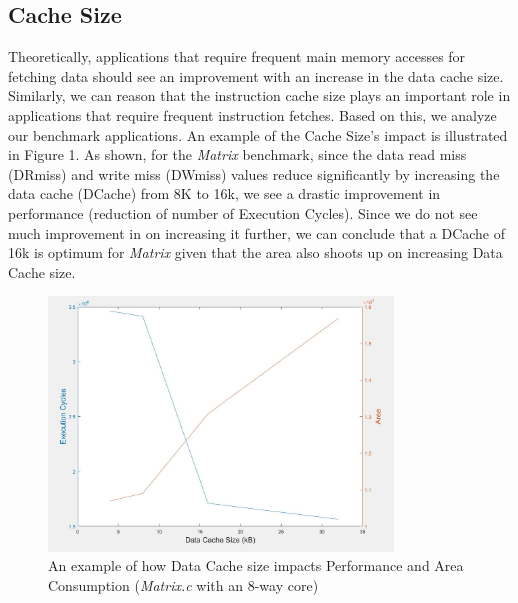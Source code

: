 \documentclass[conference]{IEEEtran}
\begin{document}
\subsection{Cache Size}
Theoretically, applications that require frequent main memory accesses for fetching data should see an improvement with an increase in the data cache size. Similarly, we can reason that the instruction cache size plays an important role in applications that require frequent instruction fetches.
Based on this, we analyze our benchmark applications.
An example of the Cache Size's impact is illustrated in Figure 1. As shown, for the \textit{Matrix} benchmark, since the data read miss (DRmiss) and write miss (DWmiss) values reduce significantly by increasing the data cache (DCache) from 8K to 16k, we see a drastic improvement in performance (reduction of number of Execution Cycles). Since we do not see much improvement in on increasing it further, we can conclude that a DCache of 16k is optimum for \textit{Matrix} given that the area also shoots up on increasing Data Cache size.

\begin{figure}[h!]
\centering
\includegraphics[width=3.6in]{CachePlot.JPG}
\caption{\label{fig:data} An example of how Data Cache size impacts Performance and Area Consumption (\textit{Matrix.c} with an 8-way core)}
\end{figure}
\end{document}
